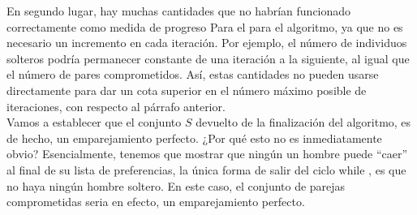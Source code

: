 \documentclass[a4paper]{article}
\begin{document}
En segundo lugar, hay muchas cantidades que no habrían funcionado correctamente como medida de progreso Para el para el algoritmo, ya que no es necesario un incremento en cada iteración. Por ejemplo, el número de individuos solteros podría permanecer constante de una iteración a la siguiente, al igual que el número de pares comprometidos. Así, estas cantidades no pueden usarse directamente para dar un cota superior en el número máximo posible de iteraciones, con respecto al párrafo anterior.   \\

Vamos a establecer que el conjunto $S$ devuelto de la finalización del algoritmo, es de hecho, un emparejamiento perfecto. ¿Por qué esto no es inmediatamente obvio? Esencialmente, tenemos que mostrar que ningún un hombre puede “caer” al final de su lista de preferencias, la única forma de salir del ciclo while , es que no haya ningún hombre soltero. En este caso, el conjunto de parejas comprometidas seria en efecto, un emparejamiento perfecto. \\ 
\end{document}
